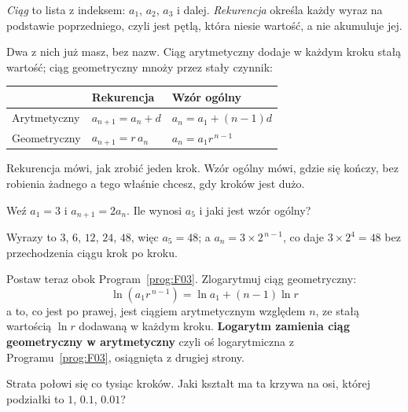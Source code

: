 \begin{fr}
\emph{Ciąg} to lista z indeksem: $a_1$, $a_2$, $a_3$ i dalej.
\emph{Rekurencja} określa każdy wyraz na podstawie poprzedniego, czyli jest
pętlą, która niesie wartość, a nie akumuluje jej.

Dwa z nich już masz, bez nazw. Ciąg arytmetyczny dodaje w każdym kroku stałą
wartość; ciąg geometryczny mnoży przez stały czynnik:

\begin{center}
\begin{tabular}{lll}
\toprule
 & Rekurencja & Wzór ogólny \\
\midrule
Arytmetyczny & $a_{n+1} = a_n + d$ & $a_n = a_1 + (n-1)d$ \\
Geometryczny & $a_{n+1} = r\,a_n$ & $a_n = a_1 r^{\,n-1}$ \\
\bottomrule
\end{tabular}
\end{center}

Rekurencja mówi, jak zrobić jeden krok. Wzór ogólny mówi, gdzie się kończy,
bez robienia żadnego \dash{} a tego właśnie chcesz, gdy kroków jest dużo.

Weź $a_1 = 3$ i $a_{n+1} = 2 a_n$. Ile wynosi $a_5$ i jaki jest wzór ogólny?
\nextframe
\end{fr}

\begin{fr}
\begin{ansblock}
Wyrazy to $3$, $6$, $12$, $24$, $48$, więc $a_5 = 48$; a
$a_n = 3 \times 2^{\,n-1}$, co daje $3 \times 2^{4} = 48$ bez przechodzenia
ciągu krok po kroku.
\end{ansblock}

Postaw teraz obok Program~\ref{prog:F03}. Zlogarytmuj ciąg geometryczny:
\[ \ln\!\left(a_1 r^{\,n-1}\right) = \ln a_1 + (n-1)\ln r \]
a to, co jest po prawej, jest ciągiem arytmetycznym względem $n$, ze stałą
wartością $\ln r$ dodawaną w każdym kroku. \textbf{Logarytm zamienia ciąg
geometryczny w arytmetyczny} \dash{} czyli oś logarytmiczna z
Programu~\ref{prog:F03}, osiągnięta z drugiej strony.

Strata połowi się co tysiąc kroków. Jaki kształt ma ta krzywa na osi, której
podziałki to $1$, $\num{0.1}$, $\num{0.01}$?
\nextframe
\end{fr}

